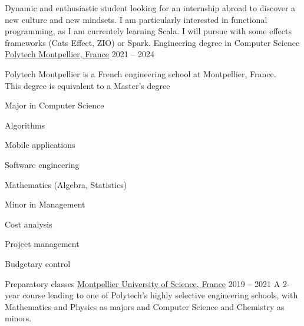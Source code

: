 \documentclass[11pt]{spidercv}
\begin{document}
\begin{MainPart}

  \color{Black}
  \vspace{0.25cm}
  Dynamic and enthusiastic student looking for an internship abroad to discover a new culture and new mindsets. I am particularly interested in functional programming, as I am currentely learning Scala. I will pursue with some effects frameworks (Cats Effect, ZIO) or Spark.
  \Experience
  {\ColorHighlight}
  {Engineering degree in Computer Science}
  {\href{https://english.polytech.umontpellier.fr/}{Polytech Montpellier, France}}
  {2021 -- 2024}
  {
    Polytech Montpellier is a French engineering school at Montpellier, France.\\
    This degree is equivalent to a Master's degree

    \begin{multicols}{2}
      Major in Computer Science
      \begin{ItemList}{\ColorHighlight}
        \item [\ding{226}] Algorithms
        \item [\ding{226}] Mobile applications
        \item [\ding{226}] Software engineering
        \item [\ding{226}] Mathematics (Algebra, Statistics)
      \end{ItemList}
      \columnbreak
      Minor in Management
      \begin{ItemList}{\ColorHighlight}
        \item [\ding{226}] Cost analysis
        \item [\ding{226}] Project management
        \item [\ding{226}] Budgetary control
      \end{ItemList}
    \end{multicols}
  }
  \Experience
  {\ColorHighlight}
  {Preparatory classes}
  {\href{https://www.umontpellier.fr/en/}{Montpellier University of Science, France}}
  {2019 -- 2021}
  {
    A 2-year course leading to one of Polytech's highly selective engineering schools, with Mathematics and Physics as majors and Computer Science and Chemistry as minors.
  }


\end{MainPart}
\end{document}
